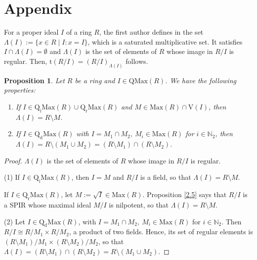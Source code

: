 \documentclass[12pt,leqno]{amsart}
\newtheorem{proposition}[theorem]{Proposition}
\theoremstyle{definition}
\begin{document}
\section{Appendix}

For a proper ideal $I$ of a ring $R$, the first author defines in \cite[D\'efinitions 1, 2 and 3]{PICANAL} the set $\Lambda (I):=\{x\in R\mid I:x=I\}$, which is a saturated multiplicative set. It satisfies $I\cap\Lambda(I)=\emptyset$ and $\Lambda(I)$ is the set of elements of $R$ whose image in $R/I$ is regular. Then, $\mathrm{t}(R/I)=(R/I)_{\Lambda (I)}$ follows.

\begin{proposition}\label{2.82} Let $R$ be a ring and $I\in\mathrm{QMax}(R)$.  We have the following properties: 
\begin{enumerate}
\item If $I\in\mathrm{Q_iMax}(R)\cup\mathrm{Q_rMax}(R)$ and $M\in\mathrm{Max}(R)\cap\mathrm{V}(I)$, then $\Lambda(I)=R\setminus M$.
\item If $I\in\mathrm{Q_dMax}(R)$ with $I=M_1\cap M_2,\ M_i\in\mathrm {Max}(R)$ for $i\in\mathbb N_2$, then $\Lambda(I)=R\setminus(M_1\cup M_2)=(R\setminus M_1)\cap(R\setminus M_2)$.
\end{enumerate} 
\end{proposition}
\begin{proof} $\Lambda(I)$ is the set of elements of $R$ whose image in $R/I$ is regular.

(1) If $I\in\mathrm{Q_iMax}(R)$, then $I=M$ and $R/I$ is a field, so that $\Lambda (I)=R\setminus M$. 

If $I\in\mathrm{Q_rMax}(R)$, let $M:=\sqrt I\in\mathrm{Max}(R)$. Proposition \ref{2.5} says that $R/I$ is a SPIR whose maximal ideal $M/I$ is nilpotent, so that $\Lambda (I)=R\setminus M$. 

(2) Let $I\in\mathrm{Q_dMax}(R)$, with $I=M_1\cap M_2,\ M_i\in\mathrm {Max}(R)$ for $i\in\mathbb N_2$. Then $R/I\cong R/M_1\times R/M_2$, a product of two fields. Hence, its set of regular elements is $(R\setminus M_ 1)/M_1\times(R\setminus M_2)/M_ 2$, so that $\Lambda(I)=(R\setminus M_1)\cap(R\setminus M_2)=R\setminus(M_1\cup M_2)$.
\end{proof}
\end{document}
